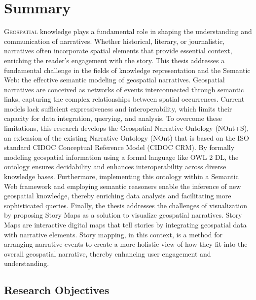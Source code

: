\chapter*{Summary}

\lettrine{G}{eospatial} knowledge plays a fundamental role in shaping the understanding and communication of narratives. Whether historical, literary, or journalistic, narratives often incorporate spatial elements that provide essential context, enriching the reader’s engagement with the story. This thesis addresses a fundamental challenge in the fields of knowledge representation and the Semantic Web: the effective semantic modeling of geospatial narratives. Geospatial narratives are conceived as networks of events interconnected through semantic links, capturing the complex relationships between spatial occurrences. Current models lack sufficient expressiveness and interoperability, which limits their capacity for data integration, querying, and analysis. To overcome these limitations, this research develops the Geospatial Narrative Ontology (NOnt+S), an extension of the existing Narrative Ontology (NOnt) that is based on the ISO standard CIDOC Conceptual Reference Model (CIDOC CRM). By formally modeling geospatial information using a formal language like OWL 2 DL, the ontology ensures decidability and enhances interoperability across diverse knowledge bases. Furthermore, implementing this ontology within a Semantic Web framework and employing semantic reasoners enable the inference of new geospatial knowledge, thereby enriching data analysis and facilitating more sophisticated queries. Finally, the thesis addresses the challenges of visualization by proposing Story Maps as a solution to visualize geospatial narratives. Story Maps are interactive digital maps that tell stories by integrating geospatial data with narrative elements. Story mapping, in this context, is a method for arranging narrative events to create a more holistic view of how they fit into the overall geospatial narrative, thereby enhancing user engagement and understanding.

\section*{Research Objectives}

